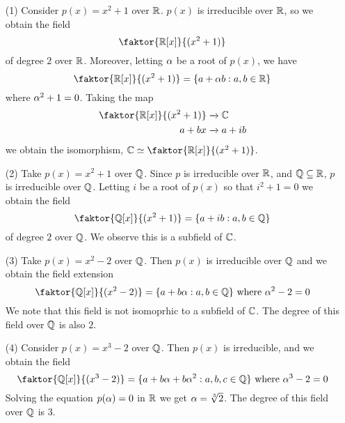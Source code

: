 \begin{example}\label{example_8.3}
  \begin{enumerate}
    \item[(1)] Consider $p(x)=x^2+1$ over $\mathbb{R}$.  $p(x)$ is irreducible
      over $\mathbb{R}$, so we obtain the field
      \begin{equation*}
        \faktor{\R[x]}{(x^2+1)}
      \end{equation*}
      of degree $2$ over $\mathbb{R}$. Moreover, letting $\alpha$ be a root of
      $p(x)$, we have
      \begin{equation*}
        \faktor{\R[x]}{(x^2+1)}=\{a+\a{b} : a,b \in \R\}
      \end{equation*}
      where $\alpha^2+1=0$. Taking the map
      \begin{align*}
        \faktor{\R[x]}{(x^2+1)} & \xrightarrow{} \C \\
        a+bx  & \xrightarrow{} a+ib \\
      \end{align*}
      we obtain the isomorphism, $\C \simeq \faktor{\R[x]}{(x^2+1)}$.

    \item[(2)] Take $p(x)=x^2+1$ over $\mathbb{Q}$. Since $p$ is irreducible
      over $\mathbb{R}$, and  $\mathbb{Q} \subseteq \mathbb{R}$, $p$ is irreducible over
      $\mathbb{Q}$. Letting $i$ be a root of $p(x)$ so that $i^2+1=0$ we
      obtain the field
      \begin{equation*}
        \faktor{\Q[x]}{(x^2+1)}=\{a+ib : a,b \in \Q\}
      \end{equation*}
      of degree $2$ over $\mathbb{Q}$. We observe this is a subfield of $\mathbb{C}$.

    \item[(3)] Take $p(x)=x^2-2$ over $\mathbb{Q}$. Then  $p(x)$ is
      irreducible over $\mathbb{Q}$ and we obtain the field extension
      \begin{equation*}
        \faktor{\Q[x]}{(x^2-2)}=\{a+b\a : a,b \in \Q\} \text{ where }
        \a^2-2=0
      \end{equation*}
      We note that this field is not isomoprhic to
      a subfield of $\mathbb{C}$. The degree of this field over $\mathbb{Q}$ is also $2$.

    \item[(4)] Consider $p(x)=x^3-2$ over $\mathbb{Q}$. Then $p(x)$ is
      irreducible, and we obtain the field
      \begin{equation*}
        \faktor{\Q[x]}{(x^3-2)}=\{a+b\a+b\a^2 : a,b,c \in \Q\} \text{
        where } \a^3-2=0
      \end{equation*}
      Solving the equation $p(\alpha)=0$ in $\mathbb{R}$ we get $\alpha=\sqrt[3]{2}$.
      The degree of this field over $\mathbb{Q}$ is $3$.


\end{enumerate}
\end{example}
